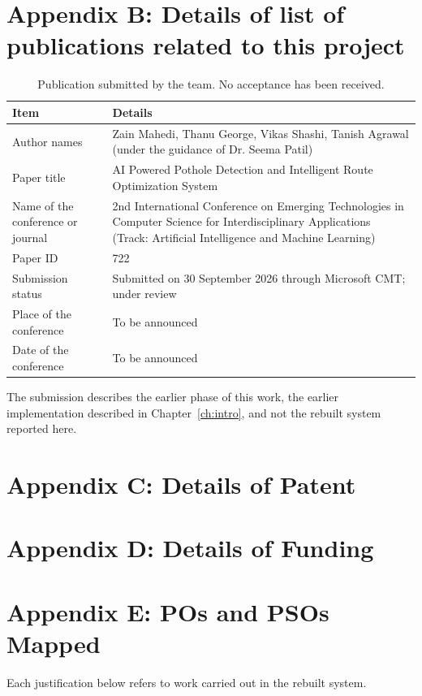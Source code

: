 \section{Appendix B: Details of list of publications related to this project}
\begin{table}[H]
\centering
\renewcommand{\arraystretch}{1.3}
\begin{tabular}{|p{4.6cm}|p{8.6cm}|}
\hline
\textbf{Item} & \textbf{Details} \\
\hline
Author names & Zain Mahedi, Thanu George, Vikas Shashi, Tanish Agrawal (under the guidance of Dr. Seema Patil) \\
\hline
Paper title & AI Powered Pothole Detection and Intelligent Route Optimization System \\
\hline
Name of the conference or journal & 2nd International Conference on Emerging Technologies in Computer Science for Interdisciplinary Applications (Track: Artificial Intelligence and Machine Learning) \\
\hline
Paper ID & 722 \\
\hline
Submission status & Submitted on 30 September 2026 through Microsoft CMT; under review \\
\hline
Place of the conference & To be announced \\
\hline
Date of the conference & To be announced \\
\hline
\end{tabular}
\caption*{Publication submitted by the team. No acceptance has been received.}
\end{table}

The submission describes the earlier phase of this work, the earlier implementation described in Chapter~\ref{ch:intro}, and not the rebuilt system reported here.
\clearpage

\section{Appendix C: Details of Patent}
\clearpage

\section{Appendix D: Details of Funding}
\clearpage

\section{Appendix E: POs and PSOs Mapped}
\setcounter{table}{0}
Each justification below refers to work carried out in the rebuilt system.

